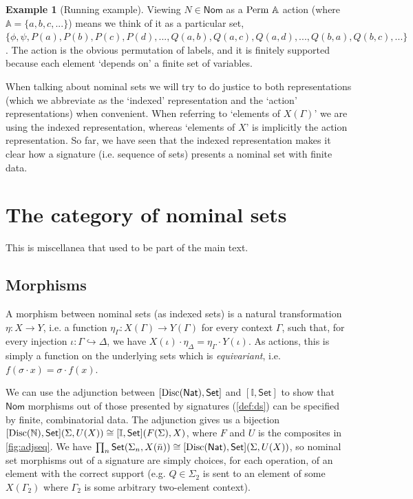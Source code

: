 \documentclass{article}
\theoremstyle{definition}
\newtheorem{example}{Example}[section]
\newcommand{\N}{\mathbb{N}}
\newcommand{\A}{\mathbb{A}}
\newcommand{\II}{\mathbb{I}}
\newcommand{\cat}[1]{\mathsf{#1}}
\newcommand{\Set}{\cat{Set}}
\newcommand{\Nom}{\cat{Nom}}
\begin{document}
\begin{example}[Running example]
    Viewing $N \in \Nom$ as a ${\rm Perm}\ \A$ action (where $\A=\{a,b,c,...\}$) means we think of it as a particular set, $\{\phi, \psi, P(a),P(b),P(c),P(d),...,Q(a,b),Q(a,c),Q(a,d),...,Q(b,a), Q(b,c),...\}$. The action is the obvious permutation of labels, and it is finitely supported because each element `depends on' a finite set of variables.
\end{example}

When talking about nominal sets we will try to do justice to both representations (which we abbreviate as the `indexed' representation and the `action' representations) when convenient. When referring to `elements of $X(\Gamma)$' we are using the indexed representation, whereas `elements of $X$' is implicitly the action representation. So far, we have seen that the indexed representation makes it clear how a signature (i.e. sequence of sets) presents a nominal set with finite data.


\section{The category of nominal sets}
\label{sec:nom}

This is miscellanea that used to be part of the main text.

\subsection*{Morphisms}

A morphism between nominal sets (as indexed sets) is a natural transformation $\eta\colon X \to Y$, i.e. a function $\eta_\Gamma\colon X(\Gamma)\to Y(\Gamma)$ for every context $\Gamma$, such that, for every injection $\iota \colon \Gamma \hookrightarrow \Delta$, we have $X(\iota)\cdot \eta_{\Delta}=\eta_\Gamma\cdot Y(\iota)$. As actions, this is simply a function on the underlying sets which is {\it equivariant}, i.e. $f(\sigma \cdot x) = \sigma \cdot f(x)$.

We can use the adjunction between $[{\rm Disc}(\cat{Nat}), \Set]$ and $[\II,\Set]$ to show that $\Nom$ morphisms out of those presented by signatures (\cref{def:ds}) can be specified by finite, combinatorial data. The adjunction gives us a bijection $[{\rm Disc}(\N), \Set](\Sigma, U(X))\cong [\II,\Set](F(\Sigma),X)$, where $F$ and $U$ is the composites in \cref{fig:adjseq}. We have $\prod_{n} \Set(\Sigma_n, X(\bar n)) \cong [{\rm Disc}(\cat{Nat}), \Set](\Sigma, U(X))$, so nominal set morphisms out of a signature are simply choices, for each operation, of an element with the correct support (e.g. $Q \in \Sigma_2$ is sent to an element of some $X(\Gamma_2)$ where $\Gamma_2$ is some arbitrary two-element context).
\end{document}
